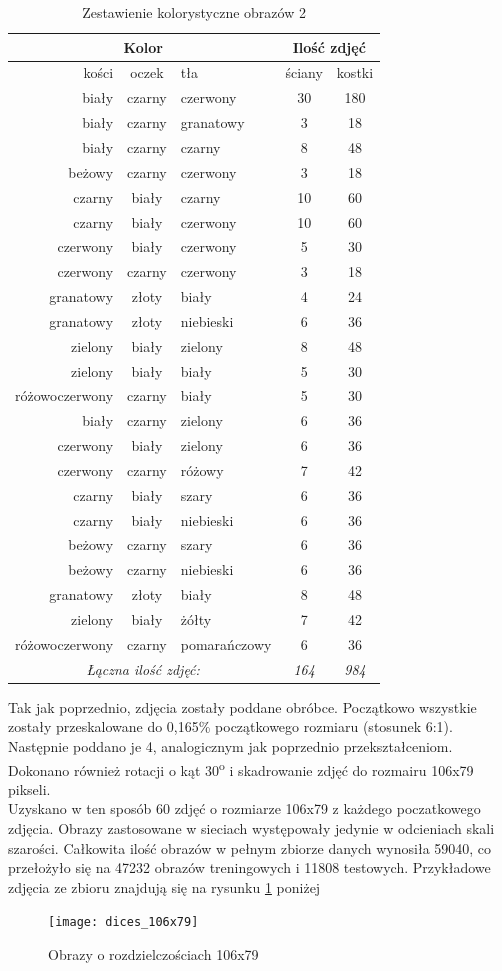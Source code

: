 \begin{table}[h!]
\centering
\begin{tabular}{rcl|cc}
\multicolumn{3}{c}{Kolor} & \multicolumn{2}{c}{Ilość zdjęć} \\ \hline
kości & oczek & tła & ściany & kostki \\ \hline
biały & czarny & czerwony & 30 & 180 \\
biały & czarny & granatowy & 3 & 18 \\
biały & czarny & czarny & 8 & 48 \\
beżowy & czarny & czerwony & 3 & 18 \\
czarny & biały & czarny & 10 & 60 \\
czarny & biały & czerwony & 10 & 60 \\
czerwony & biały & czerwony & 5 & 30 \\
czerwony & czarny & czerwony & 3 & 18 \\
granatowy & złoty & biały & 4 & 24 \\
granatowy & złoty & niebieski & 6 & 36 \\
zielony & biały & zielony & 8 & 48 \\
zielony & biały & biały & 5 & 30 \\
różowoczerwony & czarny & biały & 5 & 30 \\ \hline
biały & czarny & zielony & 6 & 36 \\
czerwony & biały & zielony & 6 & 36 \\
czerwony & czarny & różowy & 7 & 42 \\
czarny & biały & szary & 6 & 36 \\
czarny & biały & niebieski & 6 & 36 \\
beżowy & czarny & szary & 6 & 36 \\
beżowy & czarny & niebieski & 6 & 36 \\
granatowy & złoty & biały & 8 & 48 \\
zielony & biały & żółty & 7 & 42 \\
różowoczerwony & czarny & pomarańczowy & 6 & 36 \\ \hline
\multicolumn{3}{c}{\textit{Łączna ilość zdjęć:}} & \textit{164} & \textit{984}
\end{tabular}
\vspace{0.2cm}
\caption{Zestawienie kolorystyczne obrazów 2}
\label{tab:zestawienie2}
\end{table}
Tak jak poprzednio, zdjęcia zostały poddane obróbce. Początkowo wszystkie zostały
przeskalowane do 0,165\% początkowego rozmiaru (stosunek 6:1). Następnie poddano je 4,
analogicznym jak poprzednio przekształceniom. Dokonano również rotacji o kąt 30\textsuperscript{o}
i skadrowanie zdjęć do rozmairu 106x79 pikseli.\\
Uzyskano w ten sposób 60 zdjęć o rozmiarze 106x79 z każdego poczatkowego zdjęcia.
Obrazy zastosowane w sieciach występowały jedynie w odcieniach skali szarości.
Całkowita ilość obrazów w pełnym zbiorze danych wynosiła 59040, co przełożyło się
na 47232 obrazów treningowych i 11808 testowych. Przykładowe zdjęcia ze zbioru znajdują
się na rysunku \ref{fig:rects} poniżej

\begin{figure}[h!]
\centering
\texttt{[image: dices\_106x79]}
\caption{Obrazy o rozdzielczościach 106x79}
\label{fig:rects}
\end{figure}
